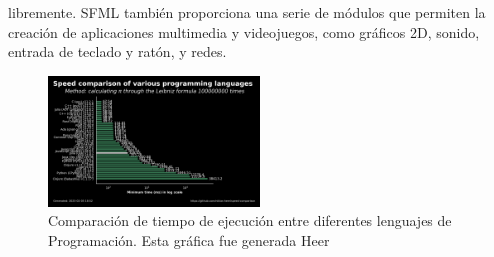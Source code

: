         libremente. SFML tambi\'en proporciona una serie de m\'odulos que permiten la creaci\'on de aplicaciones multimedia 
        y videojuegos, como gr\'aficos 2D, sonido, entrada de teclado y rat\'on, y redes.
    \vskip 0.5cm
    \begin{figure}[h]  
        \centering
        \includegraphics[width=0.5\textwidth]{./images/marco_teorico/Grafico/ComparacionLenguajes.png}
        \caption{Comparaci\'on de tiempo de ejecuci\'on entre diferentes lenguajes de Programaci\'on. Esta gr\'afica fue generada Heer \cite{ComparitionLanguajes}}
        \label{fig:tiempoEjecucion}
    \end{figure}
    \clearpage